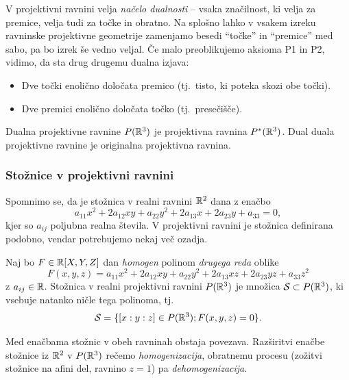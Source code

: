 V projektivni ravnini velja \emph{načelo dualnosti} -- vsaka značilnost, ki velja za premice, velja tudi za točke in obratno. Na splošno lahko v vsakem izreku ravninske projektivne geometrije zamenjamo besedi ``točke'' in ``premice'' med sabo, pa bo izrek še vedno veljal. Če malo preoblikujemo aksioma P1 in P2, vidimo, da sta drug drugemu dualna izjava:
\begin{itemize}
    \item Dve točki enolično določata premico (tj.\ tisto, ki poteka skozi obe točki).
    \item Dve premici enolično določata točko (tj.\ presečišče).
\end{itemize}
Dualna projektivne ravnine $P(\mathbb R^3)$ je projektivna ravnina $P^*(\mathbb R^3)$. Dual duala projektivne ravnine je originalna projektivna ravnina.

\subsubsection*{Stožnice v projektivni ravnini}
\label{podpogl:stoznice_projektivna}

Spomnimo se, da je stožnica v realni ravnini $\mathbb R^2$ dana z enačbo
$$a_{11}x^2 + 2a_{12}xy + a_{22}y^2 + 2a_{13}x + 2a_{23}y + a_{33} = 0,$$
kjer so $a_{ij}$ poljubna realna števila. V projektivni ravnini je stožnica definirana podobno, vendar potrebujemo nekaj več ozadja.
\begin{definicija}
    Naj bo $F \in \mathbb R[X,Y,Z]$ dan \emph{homogen} polinom \emph{drugega reda} oblike
    \begin{equation}
        \label{eq:stoznica_splosna}
        F(x,y,z) = a_{11}x^2 + 2a_{12}xy + a_{22}y^2 + 2a_{13}xz + 2a_{23}yz + a_{33}z^2
    \end{equation}
    z $a_{ij} \in \mathbb R$. Stožnica v realni projektivni ravnini $P(\mathbb R^3)$ je množica $\mathcal{S} \subset P(\mathbb R^3)$, ki vsebuje natanko ničle tega polinoma, tj.
    $$ \mathcal{S} = \{[x:y:z] \in P(\mathbb R^3); F(x,y,z) = 0\}.$$  
\end{definicija}
\begin{opomba}
    Med enačbama stožnic v obeh ravninah obstaja povezava. Razširitvi enačbe stožnice iz $\mathbb R^2$ v $P(\mathbb R^3)$ rečemo \emph{homogenizacija}, obratnemu procesu (zožitvi stožnice na afini del, ravnino $z = 1$) pa \emph{dehomogenizacija}.
\end{opomba}

